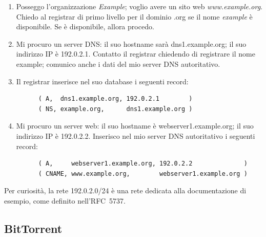 \documentclass[12pt,a4paper]{article}
\begin{document}
\begin{enumerate}
  \item
    Posseggo l'organizzazione \emph{Example}; voglio avere un sito web \emph{www.example.org}.
    Chiedo al registrar di primo livello per il dominio .org se il nome \emph{example} è disponibile.
    Se è disponibile, allora procedo.
  \item
    Mi procuro un server DNS: il suo hostname sarà dns1.example.org; il suo indirizzo IP è 192.0.2.1.
    Contatto il registrar chiedendo
    di registrare il nome example; comunico anche i dati del mio server DNS autoritativo.
  \item Il registrar inserisce nel suo database i seguenti record:
    \begin{verbatim}
      ( A,  dns1.example.org, 192.0.2.1        )
      ( NS, example.org,      dns1.example.org )
    \end{verbatim}
  \item
    Mi procuro un server web: il suo hostname è webserver1.example.org; il suo indirizzo IP è 192.0.2.2.
    Inserisco nel mio server DNS autoritativo i seguenti record:
    \begin{verbatim}
      ( A,     webserver1.example.org, 192.0.2.2              )
      ( CNAME, www.example.org,        webserver1.example.org )
    \end{verbatim}
\end{enumerate}

Per curiosità, la rete 192.0.2.0/24 è una rete dedicata alla documentazione
di esempio, come definito nell'RFC~5737.

\subsection{BitTorrent}
\end{document}
